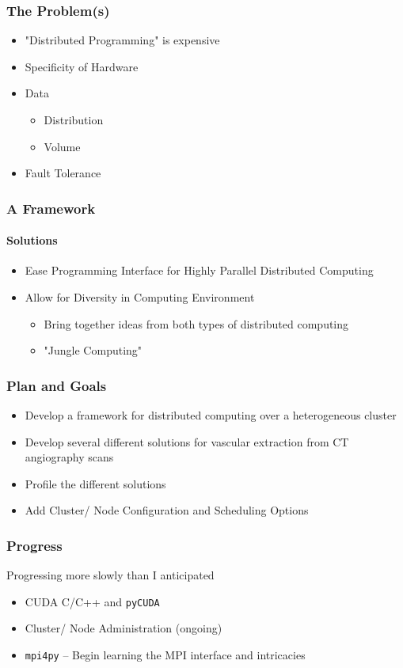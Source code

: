 \documentclass{beamer}
\begin{document}
\begin{frame}
\frametitle{The Problem(s)}
\begin{itemize}
\item{"Distributed Programming" is expensive}
\item{Specificity of Hardware}
\item{Data}
\begin{itemize}
\item{Distribution}
\item{Volume}
\end{itemize}
\item{Fault Tolerance}
\end{itemize}
\end{frame}
\begin{frame}
\frametitle{A Framework}
\framesubtitle{Solutions}
\begin{itemize}
\item{Ease Programming Interface for Highly Parallel Distributed Computing}
\item{Allow for Diversity in Computing Environment}
\begin{itemize}
\item{Bring together ideas from both types of distributed computing}
\item{"Jungle Computing"}
\end{itemize}
\end{itemize}
\end{frame}
\begin{frame}
\frametitle{Plan and Goals}
\begin{itemize}
\item{Develop a framework for distributed computing over a heterogeneous
cluster}
\item{Develop several different solutions for vascular extraction from CT
angiography scans}
\item{Profile the different solutions}
\item{Add Cluster/ Node Configuration and Scheduling Options}
\end{itemize}
\end{frame}
\begin{frame}
\frametitle{Progress}
Progressing more slowly than I anticipated
\begin{itemize}
\item{CUDA C/C++ and \texttt{pyCUDA}}
\item{Cluster/ Node Administration (ongoing)}
\item{\texttt{mpi4py} -- Begin learning the MPI interface and intricacies}
\end{itemize}
\end{frame}
\end{document}
